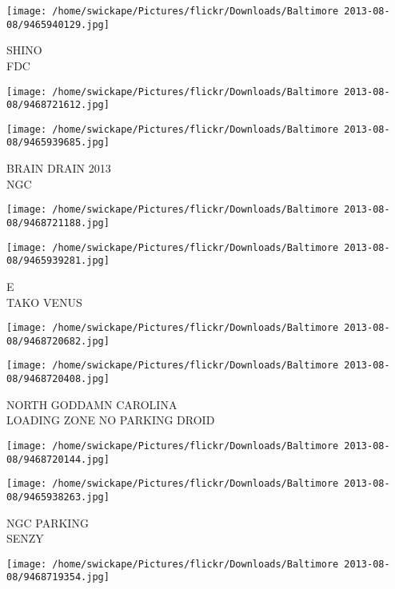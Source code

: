 \documentclass[10pt,letterpaper]{article}
\begin{document}
\vspace{0.25in}
\texttt{[image: /home/swickape/Pictures/flickr/Downloads/Baltimore 2013-08-08/9465940129.jpg]}

SHINO\\
FDC\\
\pagebreak

\texttt{[image: /home/swickape/Pictures/flickr/Downloads/Baltimore 2013-08-08/9468721612.jpg]}

\vspace{0.25in}
\texttt{[image: /home/swickape/Pictures/flickr/Downloads/Baltimore 2013-08-08/9465939685.jpg]}

BRAIN DRAIN 2013\\
NGC\\
\pagebreak

\texttt{[image: /home/swickape/Pictures/flickr/Downloads/Baltimore 2013-08-08/9468721188.jpg]}

\vspace{0.25in}
\texttt{[image: /home/swickape/Pictures/flickr/Downloads/Baltimore 2013-08-08/9465939281.jpg]}

E\\
TAKO VENUS\\
\pagebreak

\texttt{[image: /home/swickape/Pictures/flickr/Downloads/Baltimore 2013-08-08/9468720682.jpg]}

\vspace{0.25in}
\texttt{[image: /home/swickape/Pictures/flickr/Downloads/Baltimore 2013-08-08/9468720408.jpg]}

NORTH GODDAMN CAROLINA\\
LOADING ZONE NO PARKING DROID\\
\pagebreak

\texttt{[image: /home/swickape/Pictures/flickr/Downloads/Baltimore 2013-08-08/9468720144.jpg]}

\vspace{0.25in}
\texttt{[image: /home/swickape/Pictures/flickr/Downloads/Baltimore 2013-08-08/9465938263.jpg]}

NGC PARKING\\
SENZY\\
\pagebreak

\texttt{[image: /home/swickape/Pictures/flickr/Downloads/Baltimore 2013-08-08/9468719354.jpg]}
\end{document}
